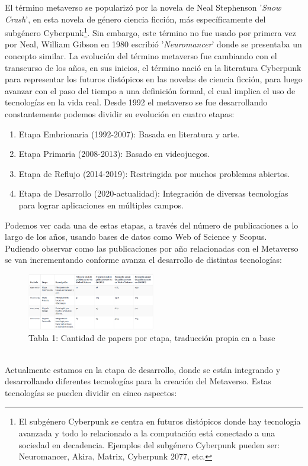 \documentclass[a4paper,10pt]{article}
\begin{document}
	El término metaverso se popularizó por la novela de Neal Stephenson '\textit{Snow Crash}', en esta novela de género ciencia ficción, más específicamente del subgénero Cyberpunk\footnote{El subgénero Cyberpunk se centra en futuros distópicos donde hay tecnología avanzada y todo lo relacionado a la computación está conectado a una sociedad en decadencia. Ejemplos del subgénero Cyberpunk pueden ser: Neuromancer, Akira, Matrix, Cyberpunk 2077, etc.}. Sin embargo, este término no fue usado por primera vez por Neal, William Gibson en 1980 escribió '\textit{Neuromancer}' donde se presentaba un concepto similar.
	La evolución del término metaverso fue cambiando con el transcurso de los años, en sus inicios, el término nació en la literatura Cyberpunk para representar los futuros distópicos en las novelas de ciencia ficción, para luego avanzar con el paso del tiempo a una definición formal, el cual implica el uso de tecnologías en la vida real. Desde 1992 el metaverso se fue desarrollando constantemente podemos dividir su evolución en cuatro etapas:
	\begin{enumerate}
		\item Etapa Embrionaria (1992-2007): Basada en literatura y arte.
		\item Etapa Primaria (2008-2013): Basado en videojuegos.
		\item Etapa de Reflujo (2014-2019): Restringida por muchos problemas abiertos.
		\item Etapa de Desarrollo (2020-actualidad): Integración de diversas tecnologías para lograr aplicaciones en múltiples campos.
	\end{enumerate}
	Podemos ver cada una de estas etapas, a través del número de publicaciones a lo largo de los años, usando bases de datos como Web of Science y Scopus. Pudiendo observar como las publicaciones por año relacionadas con el Metaverso se van incrementando conforme avanza el desarrollo de distintas  tecnologías:
	\begin{figure}[h]
		\centering
		\includegraphics[width=0.5\textwidth]{tablaPublicaciones.PNG}
		\caption{Tabla 1: Cantidad de papers por etapa, traducción propia en a base \textcite{ning2023survey}}
		\label{fig:tabla_publicaciones}
	\end{figure} \\
	Actualmente estamos en la etapa de desarrollo, donde se están integrando y desarrollando diferentes tecnologías para la creación del Metaverso.  Estas tecnologías se pueden dividir en cinco aspectos:
\end{document}

